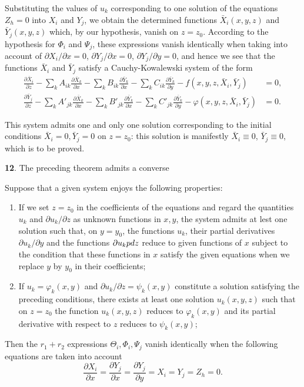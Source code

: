 \documentclass[leqno,11pt]{article}
\newcommand{\pd}{\partial}
\theoremstyle{shape1}
\theoremstyle{shape0}
\theoremstyle{shape2}
\theoremstyle{definition}
\begin{document}
Substituting the values of $u_{k}$ corresponding to one solution of the equations $Z_{h}=0$ into $X_{i}$ and $Y_{j}$, we obtain the determined functions $\bar X_{i}(x,y,z)$ and $\bar Y_{j}(x,y,z)$ which, by our hypothesis, vanish on $z=z_{0}$. According to the hypothesis for $\Phi_{i}$ and $\Psi_{j}$, these expressions vanish identically when taking into account of $\pd X_{i}/\pd x=0$, $\pd Y_{j}/\pd x=0$, $\pd Y_{j}/\pd y=0$, and hence we see that the functions $\bar X_{i}$ and $\bar Y_{j}$ satisfy a Cauchy-Kowalewski system of the form
\begin{align*}
  \frac{\pd \bar X_{i}}{\pd z}-\sum_{k}A_{ik}\frac{\pd \bar X_{k}}{\pd x}-\sum_{k}B_{ik}\frac{\pd \bar Y_{k}}{\pd x}-\sum_{k}C_{ik}\frac{\pd \bar Y_{k}}{\pd y}-f(x,y,z,\bar X_{i},\bar Y_{j})&=0,\\
  \frac{\pd \bar Y_{j}}{\pd z}-\sum_{k}A'_{jk}\frac{\pd \bar X_{k}}{\pd x}-\sum_{k}B'_{jk}\frac{\pd \bar Y_{k}}{\pd x}-\sum_{k}C'_{jk}\frac{\pd \bar Y_{k}}{\pd y}-\varphi(x,y,z,\bar X_{i},\bar Y_{j})&=0.
\end{align*}

This system admits one and only one solution corresponding to the initial conditions $\bar X_{i}=0,\bar Y_{j}=0$ on $z=z_{0}$: this solution is manifestly $\bar X_{i}\equiv 0$, $\bar Y_{j}\equiv 0$, which is to be proved.

\vspace{12pt}

\textbf{12}. The preceding theorem admits a converse

\begin{thmc}
  Suppose that a given system enjoys the following properties:
  \begin{enumerate}
  \item If we set $z=z_{0}$ in the coefficients of the equations and regard the quantities $u_{k}$ and $\pd u_{k}/\pd z$ as unknown functions in $x, y$, the system admits at lest one solution such that, on $y=y_{0}$, the functions $u_{k}$, their partial derivatives $\pd u_{k}/\pd y$ and the functions $\pd u_{k}\/pd z$ reduce to given functions of $x$ subject to the condition that these functions in $x$ satisfy the given equations when we replace $y$ by $y_{0}$ in their coefficients;
  \item If $u_{k}=\varphi_{k}(x,y)$ and $\pd u_{k}/\pd z=\psi_{k}(x,y)$ constitute a solution satisfying the preceding conditions, there exists at least one solution $u_{k}(x,y,z)$ such that on $z=z_{0}$ the function $u_{k}(x,y,z)$ reduces to $\varphi_{k}(x,y)$ and its partial derivative with respect to $z$ reduces to $\psi_{k}(x,y)$;
  \end{enumerate}
  Then the $r_{1}+r_{2}$ expressions $\Theta_{i},\Phi_{i},\Psi_{j}$ vanish identically when the following equations are taken into account
\[
\frac{\pd X_{i}}{\pd x}=\frac{\pd Y_{j}}{\pd x}=\frac{\pd Y_{j}}{\pd y}=X_{i}=Y_{j}=Z_{h}=0.
\]
\end{thmc}
\end{document}
